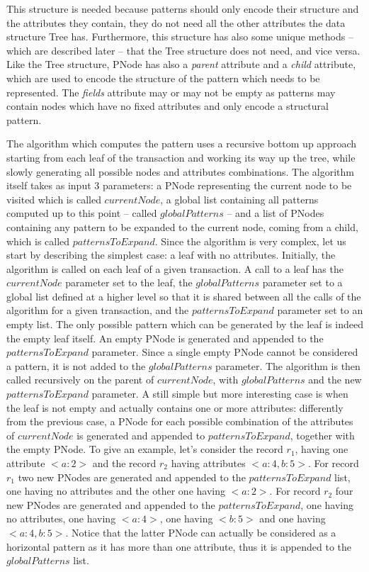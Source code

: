 \documentclass{acm_proc_article-sp-sigmod09}
\begin{document}
This structure is needed because patterns should only encode their structure and the attributes they contain, they do not need all the other attributes the data structure Tree has. Furthermore, this structure has also some unique methods -- which are described later -- that the Tree structure does not need, and vice versa. Like the Tree structure, PNode has also a \emph{parent} attribute and a \emph{child} attribute, which are used to encode the structure of the pattern which needs to be represented. The \emph{fields} attribute may or may not be empty as patterns may contain nodes which have no fixed attributes and only encode a structural pattern.

The algorithm which computes the pattern uses a recursive bottom up approach starting from each leaf of the transaction and working its way up the tree, while slowly generating all possible nodes and attributes combinations. The algorithm itself takes as input 3 parameters: a PNode representing the current node to be visited which is called $currentNode$, a global list containing all patterns computed up to this point -- called $globalPatterns$ -- and a list of PNodes containing any pattern to be expanded to the current node, coming from a child, which is called $patternsToExpand$. Since the algorithm is very complex, let us start by describing the simplest case: a leaf with no attributes. Initially, the algorithm is called on each leaf of a given transaction. A call to a leaf has the $currentNode$ parameter set to the leaf, the $globalPatterns$ parameter set to a global list defined at a higher level so that it is shared between all the calls of the algorithm for a given transaction, and the $patternsToExpand$ parameter set to an empty list. The only possible pattern which can be generated by the leaf is indeed the empty leaf itself. An empty PNode is generated and appended to the $patternsToExpand$ parameter. Since a single empty PNode cannot be considered a pattern, it is not added to the $globalPatterns$ parameter. The algorithm is then called recursively on the parent of $currentNode$, with $globalPatterns$ and the new $patternsToExpand$ parameter. A still simple but more interesting case is when the leaf is not empty and actually contains one or more attributes: differently from the previous case, a PNode for each possible combination of the attributes of $currentNode$ is generated and appended to $patternsToExpand$, together with the empty PNode.  To give an example, let's consider the record $r_1$, having one attribute $<a \colon 2>$ and the record $r_2$ having attributes $<a \colon 4, b \colon 5>$. For record $r_1$ two new PNodes are generated and appended to the $patternsToExpand$ list, one having no attributes and the other one having $<a \colon 2>$. For record $r_2$ four new PNodes are generated and appended to the $patternsToExpand$, one having no attributes, one having $<a \colon 4>$, one having $<b \colon 5>$ and one having $<a \colon 4, b \colon 5>$. Notice that the latter PNode can actually be considered as a horizontal pattern as it has more than one attribute, thus it is appended to the $globalPatterns$ list. 
\end{document}
